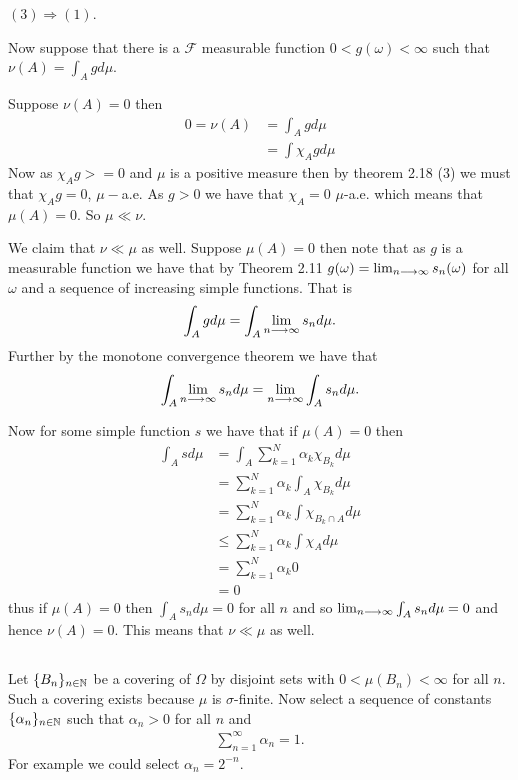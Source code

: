 \documentclass{unswmaths}
\begin{document}
$(3) \Longrightarrow (1) $.

Now suppose that there is a $ \mathcal{F} $ measurable function $ 0 < g(\omega) < \infty $ such that $ \nu(A) = \int_{A} g d\mu $.

Suppose $ \nu(A) =0 $ then
\begin{align}
	0 = \nu(A) &= \int_A g d\mu \\
	 &= \int \chi_A g d\mu
\end{align}
Now as $ \chi_A g >= 0 $ and $ \mu $ is a positive measure then by theorem 2.18 (3) we must that $ \chi_Ag = 0 $, $ \mu-$a.e. As $ g > 0 $ we have that $ \chi_A = 0 $ $ \mu$-a.e. which means that $ \mu(A) = 0 $.
So $ \mu \ll \nu $.

We claim that $ \nu \ll \mu $ as well. Suppose $ \mu(A) =0 $ then note that as $ g $ is a measurable function we have that by Theorem 2.11 $ g(\omega) = \lim_{n\longrightarrow\infty} s_n(\omega) $ for all $ \omega $ and a sequence of increasing simple functions.
That is
\begin{align}
	\int_A g d\mu = \int_A \lim_{n\longrightarrow\infty} s_n d\mu.
\end{align}
Further by the monotone convergence theorem we have that 
\begin{align}
\int_A \lim_{n\longrightarrow\infty} s_n d\mu = \lim_{n\longrightarrow\infty}\int_A s_n d\mu.
\end{align}

Now for some simple function $ s $ we have that if $ \mu(A) =0 $ then 
\begin{align}
	\int_A s d\mu &= \int_A\sum_{k=1}^{N} \alpha_k \chi_{B_k} d\mu \\
		&= \sum_{k=1}^N \alpha_k \int_A \chi_{B_k} d\mu \\
		&= \sum_{k=1}^N \alpha_k \int \chi_{B_k\cap A} d\mu \\
		&\leq  \sum_{k=1}^N \alpha_k \int \chi_{A} d\mu \\
		&= \sum_{k=1}^N \alpha_k 0\\
		&= 0
\end{align}
thus if $ \mu(A) = 0 $ then $ \int_A s_n d\mu =0 $ for all $ n $ and so $ \lim_{n \longrightarrow\infty} \int_A s_n d\mu = 0$ and hence $ \nu(A) =0 $. This means that $ \nu \ll \mu $ as well.

\subsection{}
Let $ \{ B_n \}_{n \in \mathbb{N}} $ be a covering of $ \Omega $ by disjoint sets with $ 0 < \mu(B_n) < \infty $ for all $ n $. Such a covering exists because $ \mu $ is $\sigma$-finite. Now select a sequence of constants $ \{ \alpha_n \}_{n \in \mathbb{N}} $ such that $ \alpha_n > 0 $ for all $ n $ and 
\begin{align}
	\sum_{n=1}^\infty \alpha_n = 1.
\end{align}
For example we could select  $ \alpha_n = 2^{-n} $.
\end{document}
